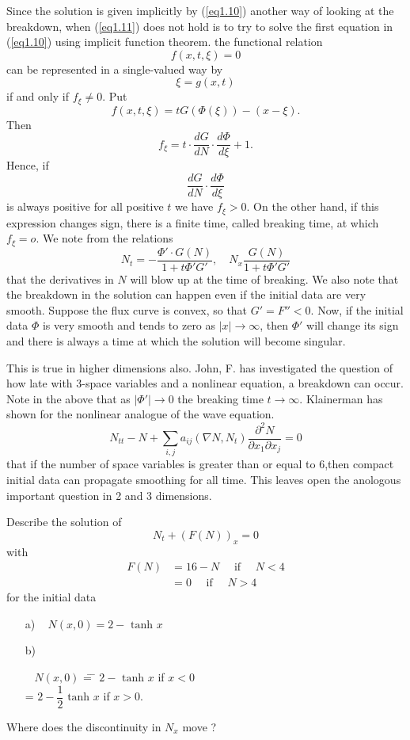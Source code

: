 Since the solution is given implicitly by (\ref{eq1.10}) another way of looking at the breakdown, when (\ref{eq1.11}) does not hold is to try to solve the first equation in (\ref{eq1.10}) using implicit function theorem. the functional relation
$$
f(x,t, \xi) = 0
$$
can be represented in a single-valued way by
$$
\xi = g(x,t)
$$
if and only if $f_\xi \neq 0$. Put
$$
f(x,t,\xi) = t G (\Phi (\xi)) - (x - \xi).
$$
Then\pageoriginale
$$
f_\xi = t \cdot \frac{dG}{dN} \cdot \frac{d\Phi}{d \xi} + 1.
$$
Hence, if 
$$
\frac{dG}{dN} \cdot \frac{d\Phi}{d\xi}
$$
is always positive for all positive $t$ we have $f_\xi > 0$. On the other hand, if this expression changes sign, there is a finite time, called breaking time, at which $f_\xi = o$. We note from the relations
$$
N_t = - \frac{\Phi' \cdot G(N)}{1+ t \Phi' G'} , \quad N_x \frac{G(N)}{1 + t \Phi' G'} 
$$
that the derivatives in $N$ will blow up at the time of breaking. We also note that the  breakdown in the solution can happen even if the initial data are very smooth. Suppose the flux curve is convex, so that $G' = F'' < 0$. Now, if the initial data $\Phi$ is very smooth and tends to zero as $|x| \to \infty$, then $\Phi'$ will change its sign and there is always a time at which the solution will become singular.

This is true in higher dimensions also. John, F. \cite{key19} has investigated the question of how late with 3-space variables and a nonlinear equation, a breakdown can occur. Note in the above that as $|\Phi'| \to 0$ the breaking time $t \to \infty$. Klainerman \cite{key21} has shown for the nonlinear analogue of the wave equation.
$$
N_{tt} - N + \sum\limits_{i,j} a_{ij} (\nabla N, N_t) \frac{\partial^2 N}{\partial x_1 \partial x_j}  = 0
$$
that if the number of space variables is greater than or equal to 6,\pageoriginale then compact initial data can propagate smoothing for all time. This leaves open the anologous important question in 2 and 3 dimensions.

\begin{exercise}\label{chap1:exer1.1}
Describe the solution of 
$$
N_t + (F(N))_x = 0
$$
with 
\begin{align*}
F(N) & = 16 - N \quad \text{ if } \quad N < 4\\
& = 0 \quad  \text{ if } \quad N > 4
\end{align*}
for the initial data 
\begin{itemize}
\item[{\rm a)}] ~ \qquad  $N (x,0) = 2 - \text{ tanh } x$

\item[{\rm b)}]  
\begin{tabbing}
~ \qquad 
$N (x, 0)$ \= =  \= $2 - \text{ tanh } x $ if $x < 0$\\
\> = \> $2 - \dfrac{1}{2} \text{ tanh } x $ if $x>0$.
\end{tabbing}
\end{itemize}
Where does the discontinuity in $N_x$ move ?
\end{exercise}

